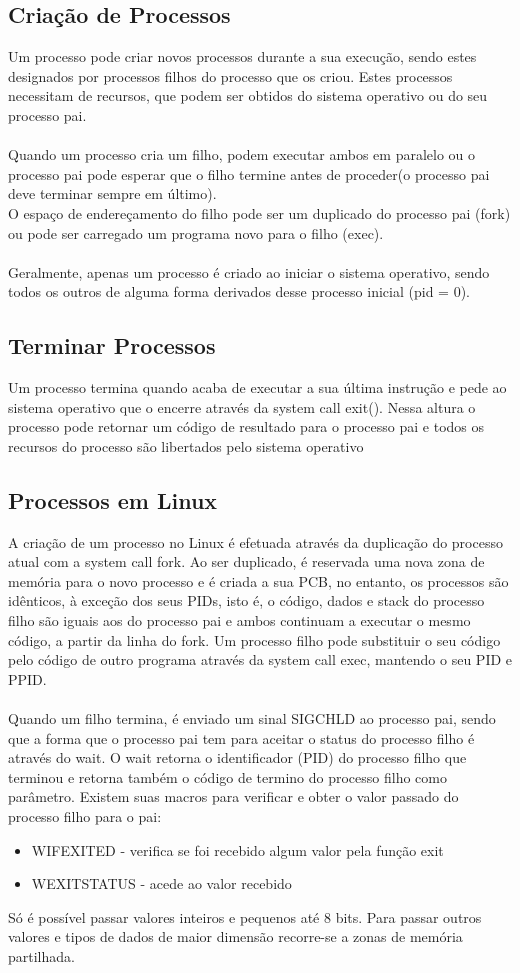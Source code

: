 \documentclass[10pt,a4paper]{report}
\begin{document}
\subsection{Criação de Processos}
Um processo pode criar novos processos durante a sua execução, sendo estes designados por processos filhos do processo que os criou. Estes processos necessitam de recursos, que podem ser obtidos do sistema operativo ou do seu processo pai.\\
\\
Quando um processo cria um filho, podem executar ambos em paralelo ou o processo pai pode esperar que o filho termine antes de proceder(o processo pai deve terminar sempre em último).\\ O espaço de endereçamento do filho pode ser um duplicado do processo pai (fork) ou pode ser carregado um programa novo para o filho (exec).\\
\\
Geralmente, apenas um processo é criado ao iniciar o sistema operativo, sendo todos os outros de alguma forma derivados desse processo inicial (pid = 0).
\subsection{Terminar Processos}
Um processo termina quando acaba de executar a sua última instrução e pede ao sistema operativo que o encerre através da system call exit().
Nessa altura o processo pode retornar um código de resultado para o processo pai e todos os recursos do processo são libertados pelo sistema operativo
\subsection{Processos em Linux}
A criação de um processo no Linux é efetuada através da duplicação do processo atual com a system call fork. Ao ser duplicado, é reservada uma nova zona de memória para o novo processo e é criada a sua PCB, no entanto, os processos são idênticos, à exceção dos seus PIDs, isto é, o código, dados e stack do processo filho são iguais aos do processo pai e ambos continuam a executar o mesmo código, a partir da linha do fork. Um processo filho pode substituir o seu código pelo código de outro programa através da system call exec, mantendo o seu PID e PPID.\\
\\
Quando um filho termina, é enviado um sinal SIGCHLD ao processo pai, sendo que a  forma que o processo pai tem para aceitar o status do processo filho é através do wait. O wait retorna o identificador (PID) do processo filho que terminou e retorna também o código de termino do processo filho como parâmetro. Existem suas macros para verificar e obter o valor passado do processo filho para o
pai:
\begin{itemize}
\item WIFEXITED - verifica se foi recebido algum valor pela função exit
\item WEXITSTATUS - acede ao valor recebido
\end{itemize}
Só é possível passar valores inteiros e pequenos até 8 bits. Para passar outros valores e tipos de dados de maior dimensão recorre-se a zonas de memória partilhada.
\end{document}
